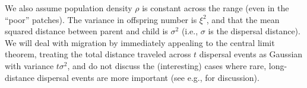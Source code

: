 \documentclass[10pt,letterpaper]{article}
\newcommand{\citep}[1]{\cite{#1}}
\newcommand{\citet}[1]{\cite{#1}}
\begin{document}
We also assume population density $\rho$ is constant across the range (even in the ``poor'' patches).
The variance in offspring number is $\xi^2$, 
and that the mean squared distance between parent and child is $\sigma^2$
(i.e., $\sigma$ is the dispersal distance). 
We will deal with migration by immediately appealing to the central limit theorem,
treating the total distance traveled across $t$  dispersal events as Gaussian with variance $t \sigma^2$,
and do not discuss the (interesting) cases where rare, long-distance dispersal events
are more important (see e.g., \citet{levin2003ecology,ralph2010parallel,hallatschek2014acceleration} for discussion).  
\end{document}
